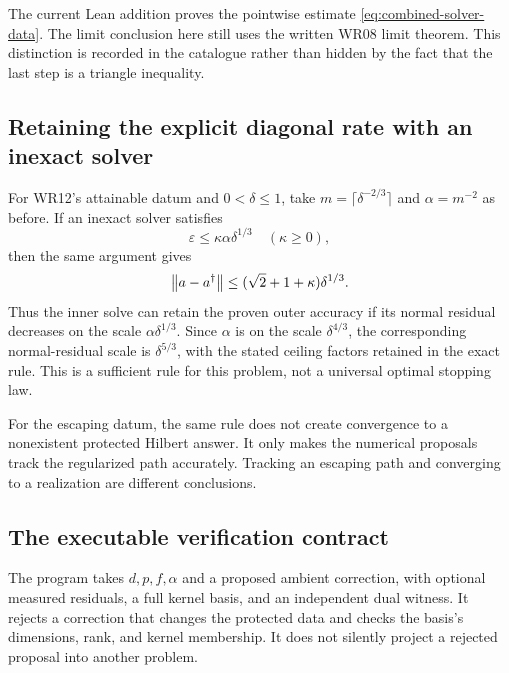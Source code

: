 The current Lean addition proves the pointwise estimate \eqref{eq:combined-solver-data}. The limit conclusion here still uses the written WR08 limit theorem. This distinction is recorded in the catalogue rather than hidden by the fact that the last step is a triangle inequality.

\subsection{Retaining the explicit diagonal rate with an inexact solver}
For WR12's attainable datum and $0<\delta\le1$, take $m=\lceil\delta^{-2/3}\rceil$ and $\alpha=m^{-2}$ as before. If an inexact solver satisfies
\[
 \varepsilon\le\kappa\alpha\delta^{1/3}
 \quad(\kappa\ge0),
\]
then the same argument gives
\[
 \left\lVert a-a^\dagger\right\rVert\le(\sqrt2+1+\kappa)\delta^{1/3}.
\]
Thus the inner solve can retain the proven outer accuracy if its normal residual decreases on the scale $\alpha\delta^{1/3}$. Since $\alpha$ is on the scale $\delta^{4/3}$, the corresponding normal-residual scale is $\delta^{5/3}$, with the stated ceiling factors retained in the exact rule. This is a sufficient rule for this problem, not a universal optimal stopping law.


For the escaping datum, the same rule does not create convergence to a nonexistent protected Hilbert answer. It only makes the numerical proposals track the regularized path accurately. Tracking an escaping path and converging to a realization are different conclusions.

\subsection{The executable verification contract}
The program takes $d,p,f,\alpha$ and a proposed ambient correction, with optional measured residuals, a full kernel basis, and an independent dual witness. It rejects a correction that changes the protected data and checks the basis's dimensions, rank, and kernel membership. It does not silently project a rejected proposal into another problem.

